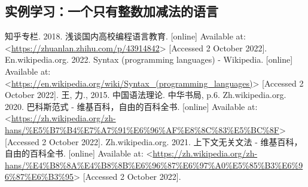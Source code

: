 \documentclass[../main.tex]{subfiles}
\begin{document}
  \subsection{实例学习：一个只有整数加减法的语言}

  \begin{thebibliography}{5}
     知乎专栏. 2018. 浅谈国内高校编程语言教育. [online] Available at: <\url{https://zhuanlan.zhihu.com/p/43914842}> [Accessed 2 October 2022].
     En.wikipedia.org. 2022. Syntax (programming languages) - Wikipedia. [online] Available at: <\url{https://en.wikipedia.org/wiki/Syntax_(programming_languages)}> [Accessed 2 October 2022].
     王, 力., 2015. 中国语法理论. 中华书局, p.6.
     Zh.wikipedia.org. 2020. 巴科斯范式 - 维基百科，自由的百科全书. [online] Available at: <\url{https://zh.wikipedia.org/zh-hans/%E5%B7%B4%E7%A7%91%E6%96%AF%E8%8C%83%E5%BC%8F}> [Accessed 2 October 2022]. 
     Zh.wikipedia.org. 2021. 上下文无关文法 - 维基百科，自由的百科全书. [online] Available at: <\url{https://zh.wikipedia.org/zh-hans/%E4%B8%8A%E4%B8%8B%E6%96%87%E6%97%A0%E5%85%B3%E6%96%87%E6%B3%95}> [Accessed 2 October 2022].
  \end{thebibliography}
\end{document}
